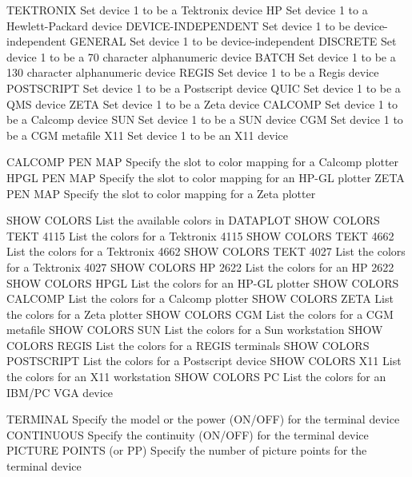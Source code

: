    TEKTRONIX                   Set device 1 to be a Tektronix device
   HP                          Set device 1 to a Hewlett-Packard device
   DEVICE-INDEPENDENT          Set device 1 to be device-independent
   GENERAL                     Set device 1 to be device-independent
   DISCRETE                    Set device 1 to be a 70 character
                               alphanumeric device
   BATCH                       Set device 1 to be a 130 character
                               alphanumeric device
   REGIS                       Set device 1 to be a Regis device
   POSTSCRIPT                  Set device 1 to be a Postscript device
   QUIC                        Set device 1 to be a QMS device
   ZETA                        Set device 1 to be a Zeta device
   CALCOMP                     Set device 1 to be a Calcomp device
   SUN                         Set device 1 to be a SUN device
   CGM                         Set device 1 to be a CGM metafile
   X11                         Set device 1 to be an X11 device
 
   CALCOMP PEN MAP             Specify the slot to color mapping for a
                               Calcomp plotter
   HPGL PEN MAP                Specify the slot to color mapping for an
                               HP-GL plotter
   ZETA PEN MAP                Specify the slot to color mapping for a
                               Zeta plotter
 
   SHOW COLORS                 List the available colors in DATAPLOT
   SHOW COLORS TEKT 4115       List the colors for a Tektronix 4115
   SHOW COLORS TEKT 4662       List the colors for a Tektronix 4662
   SHOW COLORS TEKT 4027       List the colors for a Tektronix 4027
   SHOW COLORS HP 2622         List the colors for an HP 2622
   SHOW COLORS HPGL            List the colors for an HP-GL plotter
   SHOW COLORS CALCOMP         List the colors for a Calcomp plotter
   SHOW COLORS ZETA            List the colors for a Zeta plotter
   SHOW COLORS CGM             List the colors for a CGM metafile
   SHOW COLORS SUN             List the colors for a Sun workstation
   SHOW COLORS REGIS           List the colors for a REGIS terminals
   SHOW COLORS POSTSCRIPT      List the colors for a Postscript device
   SHOW COLORS X11             List the colors for an X11 workstation
   SHOW COLORS PC              List the colors for an IBM/PC VGA device
 
   TERMINAL                    Specify the model or the power (ON/OFF)
                               for the terminal device
   CONTINUOUS                  Specify the continuity (ON/OFF) for the
                               terminal device
   PICTURE POINTS (or PP)      Specify the number of picture points for
                               the terminal device
 
